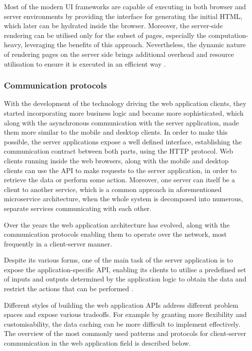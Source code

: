 Most of the modern UI frameworks are capable of executing in both browser and server environments by providing the interface for generating the initial HTML, which later can be hydrated inside the browser. Moreover, the server-side rendering can be utilised only for the subset of pages, especially the computation-heavy, leveraging the benefits of this approach. Nevertheless, the dynamic nature of rendering pages on the server side brings additional overhead and resource utilisation to ensure it is executed in an efficient way \cite{GoogleRenderingOnTheWeb}.

\subsubsection{Communication protocols} \label{chapter:communication-protocols}

With the development of the technology driving the web application clients, they started incorporating more business logic and became more sophisticated, which along with the asynchronous communication with the server application, made them more similar to the mobile and desktop clients. In order to make this possible, the server applications expose a well defined interface, establishing the communication contract between both parts, using the HTTP protocol. Web clients running inside the web browsers, along with the mobile and desktop clients can use the API to make requests to the server application, in order to retrieve the data or perform some action. Moreover, one server can itself be a client to another service, which is a common approach in aforementioned microservice architecture, when the whole system is decomposed into numerous, separate services communicating with each other.

Over the years the web application architecture has evolved, along with the communication protocols enabling them to operate over the network, most frequently in a client-server manner. 

Despite its various forms, one of the main task of the server application is to expose the application-specific API, enabling its clients to utilise a predefined set of inputs and outputs determined by the application logic to obtain the data and restrict the actions that can be performed \cite{DesignDataIntensiveApplications}.

Different styles of building the web application APIs address different problem spaces and expose various tradeoffs. For example by granting more flexibility and customisability, the data caching can be more difficult to implement effectively.
The overview of the most commonly used patterns and protocols for client-server communication in the web application field is described below.

